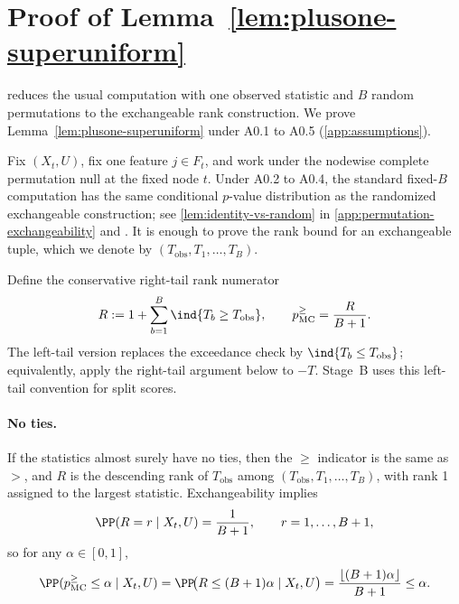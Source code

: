 \section{Proof of Lemma~\ref{lem:plusone-superuniform}}
\label{app:proof-plusone}

 reduces the usual computation with one
observed statistic and $B$ random permutations to the exchangeable rank
construction. We prove Lemma~\ref{lem:plusone-superuniform} under A0.1 to A0.5
(\cref{app:assumptions}).

Fix $(X_t,U)$, fix one feature $j \in F_t$, and work under the
nodewise complete permutation null at the fixed node $t$. Under A0.2 to A0.4, the
standard fixed-$B$ computation has the same conditional $p$-value distribution
as the randomized exchangeable construction; see
\cref{lem:identity-vs-random} in \cref{app:permutation-exchangeability} and
\citet{HemerikGoeman2018ExactTestingRandomPermutations}. It is enough
to prove the rank bound for an exchangeable tuple, which we denote by
$(T_{\mathrm{obs}},T_1,\dots,T_B)$.

Define the conservative right-tail rank numerator
%
\begin{equation}
  R := 1 + \sum_{b=1}^B \ind\{T_b \ge T_{\mathrm{obs}}\},
  \qquad
  p_{\mathrm{MC}}^{\ge} = \frac{R}{B+1}.
\end{equation}
%
The left-tail version replaces the exceedance check by
$\ind\{T_b \le T_{\mathrm{obs}}\}$; equivalently, apply the right-tail argument
below to $-T$. Stage~B uses this left-tail convention for split scores.

\paragraph{No ties.}
If the statistics almost surely have no ties, then the $\ge$ indicator is the
same as $>$, and $R$ is the descending rank of $T_{\mathrm{obs}}$ among
$(T_{\mathrm{obs}},T_1,\dots,T_B)$, with rank 1 assigned to the largest
statistic. Exchangeability implies
%
\begin{equation}
  \PP(R = r \mid X_t,U) = \frac{1}{B+1}, \qquad r=1,\dots,B+1,
\end{equation}
%
so for any $\alpha \in [0,1]$,
%
\begin{equation}
  \PP(p_{\mathrm{MC}}^{\ge} \le \alpha \mid X_t,U)
  = \PP\!\big(R \le (B+1)\alpha \mid X_t,U\big)
  = \frac{\lfloor (B+1)\alpha \rfloor}{B+1}
  \le \alpha.
\end{equation}

